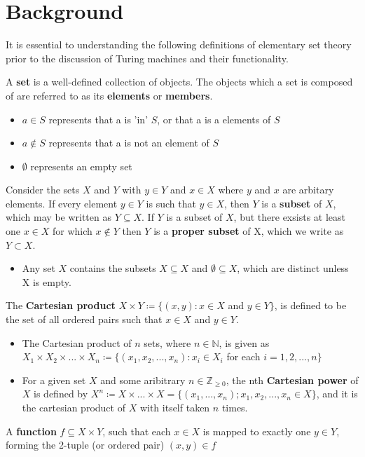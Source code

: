 \documentclass{article}
\begin{document}
\section{Background}
It is essential to understanding the following definitions of elementary set theory prior to the discussion of Turing machines and their functionality.
\begin{defin}
A \textbf{set} is a well-defined collection of objects. The objects which a set is composed of are referred to as its \textbf{elements} or \textbf{members}.
\begin{itemize}
\item $a \in S$ represents that a is 'in' $S$, or that a is a elements of $S$
\item $a \notin S$ represents that a is not an element of $S$
\item $\emptyset$ represents an empty set
\end{itemize}
\end{defin}
\begin{defin}
Consider the sets $X$ and $Y$ with $y \in Y$ and $x \in X$ where $y$ and $x$ are arbitary elements. If every element $y \in Y$ is such that $y \in X$, then $Y$ is a \textbf{subset} of $X$, which may be written as $Y\subseteq X$.
If $Y$ is a subset of $X$, but there exsists at least one $x \in X$ for which $x \notin Y$ then $Y$ is a \textbf{proper subset} of X, which we write as $Y \subset X$.
\begin{itemize}
\item Any set $X$ contains the subsets $X \subseteq X$ and $\emptyset \subseteq X$, which are distinct unless X is empty.
\end{itemize}
\end{defin}
\begin{defin}
The \textbf{Cartesian product} $X \times Y \coloneq \{ (x, y): x \in X$ and $y \in Y \}$, is defined to be the set of all ordered pairs such that $x \in X$ and $y \in Y$.
\begin{itemize}
\item The Cartesian product of $n$ sets, where $n \in \mathbb{N}$, is given as
$X_{1}\times X_{2} \times {...} \times X_{n} \coloneq \{( x_{1},x_{2},{...},x_{n}):x_{i}\in X_{i}$ for each $i = 1,2,{...},n\}$
\item For a given set $X$ and some aribitrary $n \in \mathbb{Z}_{\geq 0}$, the nth \textbf{Cartesian power} of $X$ is defined by
$X^{n} \coloneq X \times {...} \times X = \{(x_{1},{...},x_n) ; x_{1},x_{2},{...},x_{n}\in X\}$, and it is the cartesian product of $X$ with itself taken $n$ times.
\end{itemize}
\end{defin}
\begin{defin}
A \textbf{function} $f \subseteq X \times Y$, such that each $x \in X$ is mapped to exactly one $y \in Y$, forming the 2-tuple (or ordered pair) $(x, y) \in f$
\end{defin}
\end{document}
